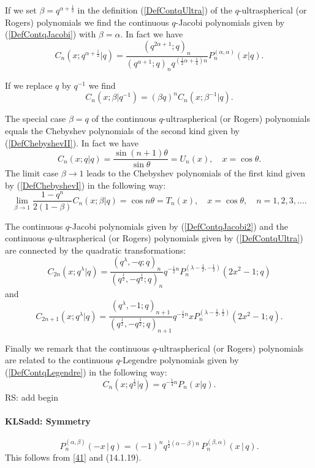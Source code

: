 \documentclass[envcountchap,graybox]{svmono}
\newcounter{rom}
\newcommand\al\alpha
\newcommand\be\beta
\newcommand\half{\frac12}
\begin{document}
\noindent
If we set $\beta=q^{\alpha+\frac{1}{2}}$ in the definition (\ref{DefContqUltra}) of
the $q$-ultraspherical (or Rogers) polynomials we find the continuous
$q$-Jacobi polynomials given by (\ref{DefContqJacobi}) with $\beta=\alpha$. In fact we have
$$C_n(x;q^{\alpha+\frac{1}{2}}|q)=
\frac{(q^{2\alpha+1};q)_n}{(q^{\alpha+1};q)_nq^{(\frac{1}{2}\alpha+\frac{1}{4})n}}P_n^{(\alpha,\alpha)}(x|q).$$

\noindent
If we replace $q$ by $q^{-1}$ we find
$$C_n(x;\beta|q^{-1})=(\beta q)^nC_n(x;\beta^{-1}|q).$$

\noindent
The special case $\beta=q$ of the continuous $q$-ultraspherical (or Rogers)
polynomials equals the Chebyshev polynomials of the second kind given by
(\ref{DefChebyshevII}). In fact we have
$$C_n(x;q|q)=\frac{\sin(n+1)\theta}{\sin\theta}=U_n(x),\quad x=\cos\theta.$$
The limit case $\beta\rightarrow 1$ leads to the Chebyshev polynomials of the
first kind given by (\ref{DefChebyshevI}) in the following way:
$$\lim_{\beta\rightarrow 1}\frac{1-q^n}{2(1-\beta)}C_n(x;\beta|q)=\cos n\theta
=T_n(x),\quad x=\cos\theta,\quad n=1,2,3,\ldots.$$

\noindent
The continuous $q$-Jacobi polynomials given by (\ref{DefContqJacobi2}) and
the continuous $q$-ultraspherical (or Rogers) polynomials given by
(\ref{DefContqUltra}) are connected by the quadratic transformations:
$$C_{2n}(x;q^{\lambda}|q)=\frac{(q^{\lambda},-q;q)_n}
{(q^{\frac{1}{2}},-q^{\frac{1}{2}};q)_n}q^{-\frac{1}{2}n}
P_n^{(\lambda-\frac{1}{2},-\frac{1}{2})}(2x^2-1;q)$$
and
$$C_{2n+1}(x;q^{\lambda}|q)=\frac{(q^{\lambda},-1;q)_{n+1}}
{(q^{\frac{1}{2}},-q^{\frac{1}{2}};q)_{n+1}}q^{-\frac{1}{2}n}
xP_n^{(\lambda-\frac{1}{2},\frac{1}{2})}(2x^2-1;q).$$

\noindent
Finally we remark that the continuous $q$-ultraspherical (or Rogers)
polynomials are related to the continuous $q$-Legendre polynomials given by (\ref{DefContqLegendre}) in the following way:
$$C_n(x;q^{\frac{1}{2}}|q)=q^{-\frac{1}{4}n}P_n(x|q).$$
 RS: add begin\label{sec14.10}
%
\paragraph{\large\bf KLSadd: Symmetry}\begin{equation}
P_n^{(\al,\be)}(-x\,|\, q)=(-1)^n q^{\half(\al-\be)n}\,P_n^{(\be,\al)}(x\,|\, q).
\label{110}
\end{equation}
This follows from \eqref{41} and (14.1.19).
%
\end{document}
